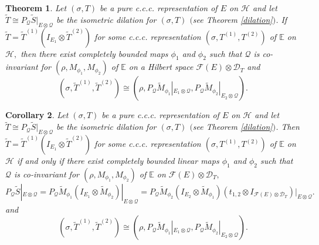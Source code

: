 \documentclass[12pt]{amsart}
\numberwithin{equation}{section}
\theoremstyle{plain}
\newtheorem{theorem}{Theorem}[section]
\newtheorem{corollary}[theorem]{Corollary}
\newcommand{\be}{\mathbb E}
\newcommand{\ot}{\otimes}
\newcommand{\wt}{\widetilde}
\newcommand{\wT}{\wt{T}}
\begin{document}
\begin{theorem}
	Let $(\sigma, T)$ be a pure c.c.c. representation  of $E$ on $\mathcal H$ and let $\wT\cong P_{\mathcal{Q}}\widetilde{S}|_{E\ot \mathcal{Q}}$ be the isometric dilation for $(\sigma, T)$ $($see Theorem \ref{dilation}$)$. If $\widetilde{T}=\widetilde{T}^{(1)}(I_{E_1} \otimes \widetilde{T}^{(2)})$ for some c.c.c. representation $(\sigma, T^{(1)}, T^{(2)})$ of $\be$ on $\mathcal H,$ then there exist completely bounded maps $\phi_1$ and $\phi_2$ such that $\mathcal{Q}$ is  co-invariant for $(\rho,M_{\phi_1},M_{\phi_2})$ of $\be$ on a
	Hilbert space $\mathcal{F}(E)\ot \mathcal{D}_{T}$ and $$(\sigma,\wT^{(1)},\wT^{(2)})\cong (\rho ,P_{\mathcal{Q}}\widetilde{M}_{\phi_1}|_{E_1\ot \mathcal{Q}},P_{\mathcal{Q}}\widetilde{M}_{\phi_2}|_{E_2\ot \mathcal{Q}}).$$ 
\end{theorem}
\begin{corollary}
		Let $(\sigma, T)$ be a pure c.c.c. representation  of $E$ on $\mathcal H$ and let $\wT\cong P_{\mathcal{Q}}\widetilde{S}|_{E\ot \mathcal{Q}}$ be the isometric dilation for $(\sigma, T)$ $($see Theorem \ref{dilation}$)$. Then $\widetilde{T}=\widetilde{T}^{(1)}(I_{E_1} \otimes \widetilde{T}^{(2)})$ for some c.c.c. representation $(\sigma, T^{(1)}, T^{(2)})$ of $\be$ on $\mathcal H$ if and only if there exist completely bounded linear maps $\phi_1$ and $\phi_2$ such that $\mathcal{Q}$ is  co-invariant for $(\rho,M_{\phi_1},M_{\phi_2})$ of $\be$ on $\mathcal{F}(E)\ot \mathcal{D}_{T},$ $$P_{\mathcal{Q}}\widetilde{S}|_{E\ot \mathcal{Q}}=P_{\mathcal{Q}}\widetilde{M}_{\phi_1}(I_{E_1}\ot \widetilde{M}_{\phi_2})|_{E\ot \mathcal{Q}}=P_{\mathcal{Q}}\widetilde{M}_{\phi_2}(I_{E_2}\ot \widetilde{M}_{\phi_1})(t_{1,2}\ot I_{\mathcal{F}(E)\ot \mathcal{D}_{T}})|_{E\ot \mathcal{Q}}.$$and $$(\sigma,\wT^{(1)},\wT^{(2)})\cong (\rho ,P_{\mathcal{Q}}\widetilde{M}_{\phi_1}|_{E_1\ot \mathcal{Q}},P_{\mathcal{Q}}\widetilde{M}_{\phi_2}|_{E_2\ot \mathcal{Q}}).$$
\end{corollary}
\end{document}
